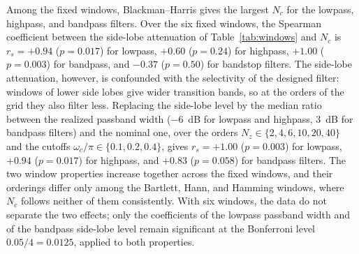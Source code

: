 \documentclass[journal]{IEEEtran}
\begin{document}
Among the fixed windows, Blackman--Harris gives the largest $N_c$ for the
lowpass, highpass, and bandpass filters. Over the six fixed windows, the
Spearman coefficient between the side-lobe attenuation of
Table~\ref{tab:windows} and $N_c$ is $r_s=+0.94$ ($p=0.017$) for lowpass,
$+0.60$ ($p=0.24$) for highpass, $+1.00$ ($p=0.003$) for bandpass, and $-0.37$
($p=0.50$) for bandstop filters. The side-lobe attenuation, however, is
confounded with the selectivity of the designed filter: windows of lower side
lobes give wider transition bands, so at the orders of the grid they also filter
less. Replacing the side-lobe level by the median ratio between the realized
passband width ($-6$~dB for lowpass and highpass, 3~dB for bandpass filters)
and the nominal one, over the orders $N_z\in\{2,4,6,10,20,40\}$ and the cutoffs
$\omega_c/\pi\in\{0.1,0.2,0.4\}$, gives $r_s=+1.00$ ($p=0.003$) for lowpass,
$+0.94$ ($p=0.017$) for highpass, and $+0.83$ ($p=0.058$) for bandpass filters.
The two window properties increase together across the fixed windows, and
their orderings differ only among the Bartlett, Hann, and Hamming windows,
where $N_c$ follows neither of them consistently. With six windows, the data do
not separate the two effects; only the coefficients of the lowpass passband
width and of the bandpass side-lobe level remain significant at the Bonferroni
level $0.05/4=0.0125$, applied to both properties.
\end{document}
